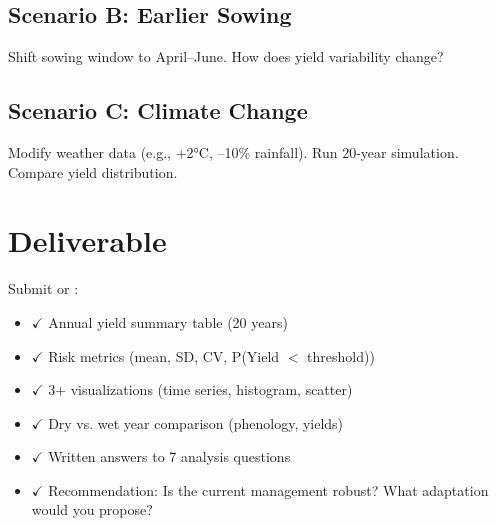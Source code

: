 \subsection{Scenario B: Earlier Sowing}

Shift sowing window to April--June. How does yield variability change?

\subsection{Scenario C: Climate Change}

Modify weather data (e.g., +2°C, --10\% rainfall). Run 20-year simulation. Compare yield distribution.

\section{Deliverable}

Submit  or :

\begin{itemize}
  \item $\checkmark$ Annual yield summary table (20 years)
  \item $\checkmark$ Risk metrics (mean, SD, CV, P(Yield $<$ threshold))
  \item $\checkmark$ 3+ visualizations (time series, histogram, scatter)
  \item $\checkmark$ Dry vs. wet year comparison (phenology, yields)
  \item $\checkmark$ Written answers to 7 analysis questions
  \item $\checkmark$ Recommendation: Is the current management robust? What adaptation would you propose?
\end{itemize}

